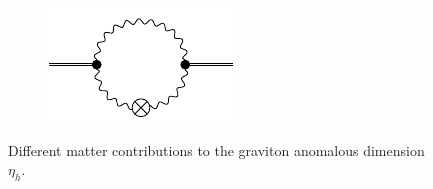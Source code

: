 \begin{figure}[H]
\begin{subfigure}{0.3\textwidth}
 	\includegraphics[width=\textwidth]{figs/TikZ/gauge_field_contribution}
 \end{subfigure} 
 \hfill
 \caption{Different matter contributions to the graviton anomalous dimension $\eta_h$.}	
 \end{figure}
 
 \blindtext
 
